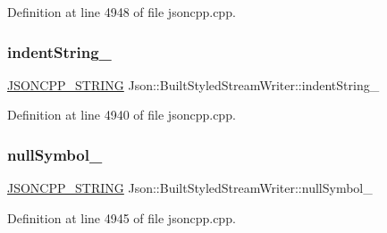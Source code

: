 Definition at line 4948 of file jsoncpp.\+cpp.

\hypertarget{struct_json_1_1_built_styled_stream_writer_a0f8115a4fb474ab0e9de25f10e5ca09a}{}\label{struct_json_1_1_built_styled_stream_writer_a0f8115a4fb474ab0e9de25f10e5ca09a} 
\subsubsection{\texorpdfstring{indent\+String\+\_\+}{indentString\_}}
{\footnotesize\ttfamily \hyperlink{config_8h_a1e723f95759de062585bc4a8fd3fa4be}{J\+S\+O\+N\+C\+P\+P\+\_\+\+S\+T\+R\+I\+NG} Json\+::\+Built\+Styled\+Stream\+Writer\+::indent\+String\+\_\+\hspace{0.3cm}{\ttfamily [private]}}



Definition at line 4940 of file jsoncpp.\+cpp.

\hypertarget{struct_json_1_1_built_styled_stream_writer_a6ccceadf4b1286a519a175cb59cb61d5}{}\label{struct_json_1_1_built_styled_stream_writer_a6ccceadf4b1286a519a175cb59cb61d5} 
\subsubsection{\texorpdfstring{null\+Symbol\+\_\+}{nullSymbol\_}}
{\footnotesize\ttfamily \hyperlink{config_8h_a1e723f95759de062585bc4a8fd3fa4be}{J\+S\+O\+N\+C\+P\+P\+\_\+\+S\+T\+R\+I\+NG} Json\+::\+Built\+Styled\+Stream\+Writer\+::null\+Symbol\+\_\+\hspace{0.3cm}{\ttfamily [private]}}



Definition at line 4945 of file jsoncpp.\+cpp.

\hypertarget{struct_json_1_1_built_styled_stream_writer_a6373d8d0ae4741b64e3904e4db0eef46}{}\label{struct_json_1_1_built_styled_stream_writer_a6373d8d0ae4741b64e3904e4db0eef46} 
